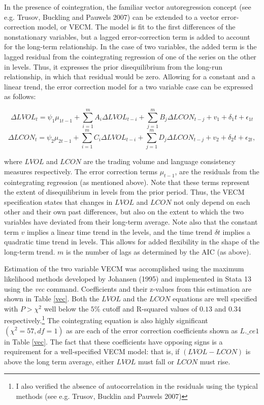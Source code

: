 In the presence of cointegration, the familiar vector autoregression concept (see e.g. Trusov, Buckling and Pauwels 2007) can be extended to a vector error-correction model, or VECM. The model is fit to the first differences of the nonstationary variables, but a lagged error-correction term is added to account for the long-term relationship. In the case of two variables, the added term is the lagged residual from the cointegrating regression of one of the series on the other in levels. Thus, it expresses the prior disequilibrium from the long-run relationship, in which that residual would be zero. Allowing for a constant and a linear trend, the error correction model for a two variable case can be expressed as follows:

\begin{equation}
	\Delta LVOL_t = \psi_1\mu_{1t-1}+\sum_{i=1}^mA_i\Delta LVOL_{t-i} + \sum_{j=1}^mB_j\Delta LCON_{t-j}+v_1+\delta_1 t+\epsilon_{1t}
\end{equation}
\begin{equation}
	\Delta LCON_t = \psi_2\mu_{2t-1}+\sum_{i=1}^mC_i\Delta LVOL_{t-i} + \sum_{j=1}^mD_j\Delta LCON_{t-j}+v_2+\delta_2 t+\epsilon_{2t},
\end{equation}

\noindent where $LVOL$ and $LCON$ are the trading volume and language consistency measures respectively. The error correction terms $\mu_{t-1}$, are the residuals from the cointegrating regression (as mentioned above). Note that these terms represent the extent of disequilibrium in levels from the prior period. Thus, the VECM specification states that changes in $LVOL$ and $LCON$ not only depend on each other and their own past differences, but also on the extent to which the two variables have deviated from their long-term average. Note also that the constant term $v$ implies a linear time trend in the levels, and the time trend $\delta t$ implies a quadratic time trend in levels. This allows for added flexibility in the shape of the long-term trend. $m$ is the number of lags as determined by the AIC (as above).

Estimation of the two variable VECM was accomplished using the maximum likelihood methods developed by Johansen (1995) and implemented in Stata 13 using the \emph{vec} command. Coefficients and their z-values from this estimation are shown in Table \ref{vec}. Both the $LVOL$ and the $LCON$ equations are well specified with $P>\chi^2$ well below the $5\%$ cutoff and R-squared values of $0.13$ and $0.34$ respectively.\footnote{I also verified the absence of autocorrelation in the residuals using the typical methods (see e.g. Trusov, Bucklin and Pauwels 2007)} The cointegrating equation is also highly significant $(\chi^2 = 57, df=1)$ as are each of the error correction coefficients shown as $L.\_ce1$ in Table \ref{vec}. The fact that these coefficients have opposing signs is a requirement for a well-specified VECM model: that is, if $(LVOL-LCON)$ is above the long term average, either $LVOL$ must fall or $LCON$ must rise. 


